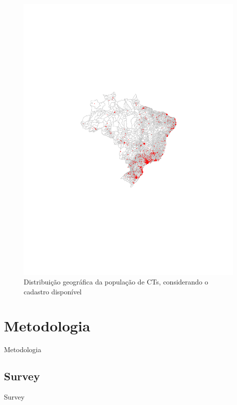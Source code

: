 \begin{frame}[plain]
\begin{figure}[h]
\centering
\includegraphics[height=.85\textheight, keepaspectratio]{figures/mapa.pdf}
\caption{Distribuição geográfica da população de CTs, considerando o cadastro disponível}
\label{fig:distrCTs}
\end{figure}
\end{frame}


\section{Metodologia}
\begin{frame}{Metodologia}

\end{frame}


\subsection{Survey}
\begin{frame}{Survey}

\end{frame}

